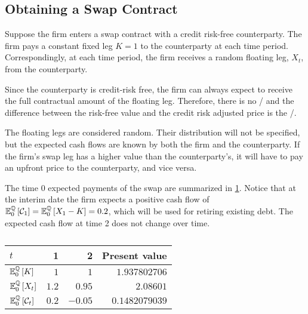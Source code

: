 \documentclass[main.tex]{subfiles}
\begin{document}
    \subsection{Obtaining a Swap Contract}
        Suppose the firm enters a swap contract with a credit risk-free counterparty.
        The firm pays a constant fixed leg $K=\num{1}$ to the counterparty at each time period.
        Correspondingly, at each time period,
        the firm receives a random floating leg, $X_t$, from the counterparty.

        Since the counterparty is credit-risk free,
        the firm can always expect to receive the full contractual amount of the floating leg.
        Therefore, there is no \CVA/ and
        the difference between the risk-free value and the credit risk adjusted price is the \DVA/.

        The floating legs are considered random.
        Their distribution will not be specified,
        but the expected cash flows are known
        by both the firm and the counterparty.
        If the firm's swap leg has a higher value than the counterparty's,
        it will have to pay an upfront price to the counterparty,
        and vice versa.

        The time 0 expected payments of the swap are summarized in \cref{tbl:swap-legs}.
        Notice that at the interim date the firm expects a positive cash flow of
        $\mathbb{E}_{0}^{\mathbb{Q}}\left[\mathcal{C}_1\right] = \mathbb{E}_{0}^{\mathbb{Q}}\left[X_1 - K\right] = \num{0.2}$,
        which will be used for retiring existing debt.
        The expected cash flow at time 2 does not change over time.

        \begin{table}[H]
            \centering
            \begin{tabular}{l|rr||r}
                $t$ & 1 & 2 & Present value \\
                \hline
                \rule{0pt}{1.1em}
                $\mathbb{E}_{0}^{\mathbb{Q}}\left[K\right]$ & $\num{1}$ & $\num{1}$ & $\num{1.937802706}$ \\
                \rule{0pt}{1.1em}
                $\mathbb{E}_{0}^{\mathbb{Q}}\left[X_t\right]$ & $\num{1.2}$ & $\num{0.95}$ & $\num{2.08601}$ \\
                \rule{0pt}{1.1em}
                $\mathbb{E}_{0}^{\mathbb{Q}}\left[\mathcal{C}_t\right]$ & $\num{0.2}$ & $\num{-0.05}$ & $\num{0.1482079039}$ \\
            \end{tabular}
            \caption{}
            \label{tbl:swap-legs}
        \end{table}
\end{document}
